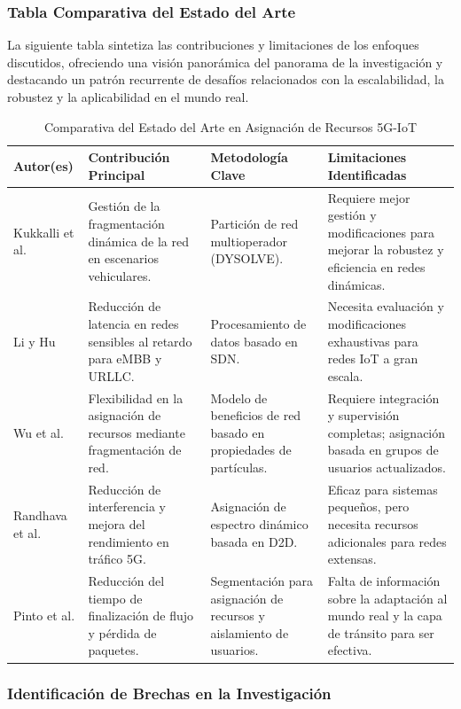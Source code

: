 \documentclass[12pt,a4paper]{article}
\begin{document}
\subsubsection{Tabla Comparativa del Estado del Arte}

La siguiente tabla sintetiza las contribuciones y limitaciones de los enfoques discutidos, ofreciendo una visión panorámica del panorama de la investigación y destacando un patrón recurrente de desafíos relacionados con la escalabilidad, la robustez y la aplicabilidad en el mundo real.

\begin{table}[H]
\centering
\small
\begin{tabular}{|p{2.5cm}|p{4cm}|p{3.5cm}|p{5cm}|}
\hline
\textbf{Autor(es)} & \textbf{Contribución Principal} & \textbf{Metodología Clave} & \textbf{Limitaciones Identificadas} \\
\hline
Kukkalli et al. & Gestión de la fragmentación dinámica de la red en escenarios vehiculares. & Partición de red multioperador (DYSOLVE). & Requiere mejor gestión y modificaciones para mejorar la robustez y eficiencia en redes dinámicas. \\
\hline
Li y Hu & Reducción de latencia en redes sensibles al retardo para eMBB y URLLC. & Procesamiento de datos basado en SDN. & Necesita evaluación y modificaciones exhaustivas para redes IoT a gran escala. \\
\hline
Wu et al. & Flexibilidad en la asignación de recursos mediante fragmentación de red. & Modelo de beneficios de red basado en propiedades de partículas. & Requiere integración y supervisión completas; asignación basada en grupos de usuarios actualizados. \\
\hline
Randhava et al. & Reducción de interferencia y mejora del rendimiento en tráfico 5G. & Asignación de espectro dinámico basada en D2D. & Eficaz para sistemas pequeños, pero necesita recursos adicionales para redes extensas. \\
\hline
Pinto et al. & Reducción del tiempo de finalización de flujo y pérdida de paquetes. & Segmentación para asignación de recursos y aislamiento de usuarios. & Falta de información sobre la adaptación al mundo real y la capa de tránsito para ser efectiva. \\
\hline
\end{tabular}
\caption{Comparativa del Estado del Arte en Asignación de Recursos 5G-IoT}
\label{tab:estado_arte}
\end{table}

\subsubsection{Identificación de Brechas en la Investigación}
\end{document}
